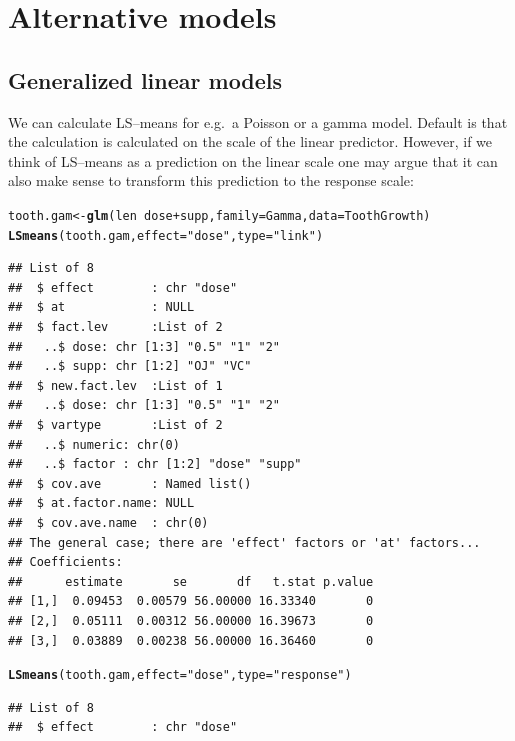 \documentclass[10pt]{article}\usepackage[]{graphicx}\usepackage[]{color}
\makeatletter
\newcommand{\hlstr}[1]{\textcolor[rgb]{0.192,0.494,0.8}{#1}}%
\newcommand{\hlopt}[1]{\textcolor[rgb]{0,0,0}{#1}}%
\newcommand{\hlstd}[1]{\textcolor[rgb]{0.345,0.345,0.345}{#1}}%
\newcommand{\hlkwb}[1]{\textcolor[rgb]{0.69,0.353,0.396}{#1}}%
\newcommand{\hlkwc}[1]{\textcolor[rgb]{0.333,0.667,0.333}{#1}}%
\newcommand{\hlkwd}[1]{\textcolor[rgb]{0.737,0.353,0.396}{\textbf{#1}}}%
\newenvironment{kframe}{%
 \def\at@end@of@kframe{}%
 \ifinner\ifhmode%
  \def\at@end@of@kframe{\end{minipage}}%
  \begin{minipage}{\columnwidth}%
 \fi\fi%
 \def\FrameCommand##1{\hskip\@totalleftmargin \hskip-\fboxsep
 \colorbox{shadecolor}{##1}\hskip-\fboxsep
     \hskip-\linewidth \hskip-\@totalleftmargin \hskip\columnwidth}%
 \MakeFramed {\advance\hsize-\width
   \@totalleftmargin\z@ \linewidth\hsize
   \@setminipage}}%
 {\par\unskip\endMakeFramed%
 \at@end@of@kframe}
\newenvironment{knitrout}{}{} %
\makeatother
\begin{document}
\section{Alternative models}
\label{sec:alternative-models}

\subsection{Generalized linear models}
\label{sec:gener-line-models}

We can calculate LS--means for e.g.\ a Poisson or a gamma model. Default is that
the calculation is calculated on the scale of the linear
predictor. However, if
we think of LS--means as a prediction on the linear scale one may
argue that it can also make sense to transform this prediction to
the response scale:
\begin{knitrout}
\color{fgcolor}\begin{kframe}
\begin{alltt}
\hlstd{tooth.gam} \hlkwb{<-} \hlkwd{glm}\hlstd{(len} \hlopt{~} \hlstd{dose} \hlopt{+} \hlstd{supp,} \hlkwc{family}\hlstd{=Gamma,} \hlkwc{data}\hlstd{=ToothGrowth)}
\hlkwd{LSmeans}\hlstd{(tooth.gam,} \hlkwc{effect}\hlstd{=}\hlstr{"dose"}\hlstd{,} \hlkwc{type}\hlstd{=}\hlstr{"link"}\hlstd{)}
\end{alltt}
\begin{verbatim}
## List of 8
##  $ effect        : chr "dose"
##  $ at            : NULL
##  $ fact.lev      :List of 2
##   ..$ dose: chr [1:3] "0.5" "1" "2"
##   ..$ supp: chr [1:2] "OJ" "VC"
##  $ new.fact.lev  :List of 1
##   ..$ dose: chr [1:3] "0.5" "1" "2"
##  $ vartype       :List of 2
##   ..$ numeric: chr(0) 
##   ..$ factor : chr [1:2] "dose" "supp"
##  $ cov.ave       : Named list()
##  $ at.factor.name: NULL
##  $ cov.ave.name  : chr(0) 
## The general case; there are 'effect' factors or 'at' factors...
## Coefficients:
##      estimate       se       df   t.stat p.value
## [1,]  0.09453  0.00579 56.00000 16.33340       0
## [2,]  0.05111  0.00312 56.00000 16.39673       0
## [3,]  0.03889  0.00238 56.00000 16.36460       0
\end{verbatim}
\begin{alltt}
\hlkwd{LSmeans}\hlstd{(tooth.gam,} \hlkwc{effect}\hlstd{=}\hlstr{"dose"}\hlstd{,} \hlkwc{type}\hlstd{=}\hlstr{"response"}\hlstd{)}
\end{alltt}
\begin{verbatim}
## List of 8
##  $ effect        : chr "dose"

\end{verbatim}
\end{kframe}
\end{knitrout}
\end{document}

